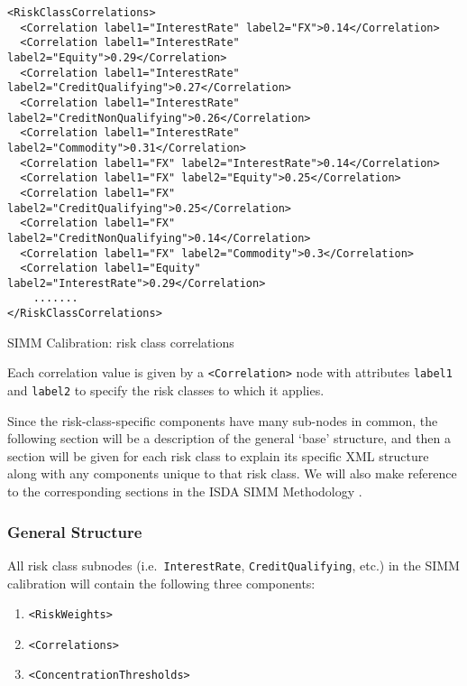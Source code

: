 \begin{listing}[H]
\begin{verbatim}
<RiskClassCorrelations>
  <Correlation label1="InterestRate" label2="FX">0.14</Correlation>
  <Correlation label1="InterestRate" label2="Equity">0.29</Correlation>
  <Correlation label1="InterestRate" label2="CreditQualifying">0.27</Correlation>
  <Correlation label1="InterestRate" label2="CreditNonQualifying">0.26</Correlation>
  <Correlation label1="InterestRate" label2="Commodity">0.31</Correlation>
  <Correlation label1="FX" label2="InterestRate">0.14</Correlation>
  <Correlation label1="FX" label2="Equity">0.25</Correlation>
  <Correlation label1="FX" label2="CreditQualifying">0.25</Correlation>
  <Correlation label1="FX" label2="CreditNonQualifying">0.14</Correlation>
  <Correlation label1="FX" label2="Commodity">0.3</Correlation>
  <Correlation label1="Equity" label2="InterestRate">0.29</Correlation>
    .......
</RiskClassCorrelations>
\end{verbatim}
\caption{SIMM Calibration: risk class correlations}
\label{lst:simmcalibration_risk_class_correlations}
\end{listing}

Each correlation value is given by a {\tt <Correlation>} node with attributes {\tt label1} and {\tt label2} to 
specify the risk classes to which it applies.

Since the risk-class-specific components have many sub-nodes in common, the following section will be a description of the
general `base' structure, and then a section will be given for each risk class to explain its specific XML structure along
with any components unique to that risk class. We will also make reference to the corresponding sections in the ISDA
SIMM Methodology \cite{SIMM2.5A}.

\subsubsection{General Structure}

All risk class subnodes (i.e.\ {\tt InterestRate}, {\tt CreditQualifying}, etc.) in the SIMM calibration will contain the following three components:

\begin{enumerate}
  \item {\tt <RiskWeights>}
  \item {\tt <Correlations>}
  \item {\tt <ConcentrationThresholds>}
\end{enumerate}


